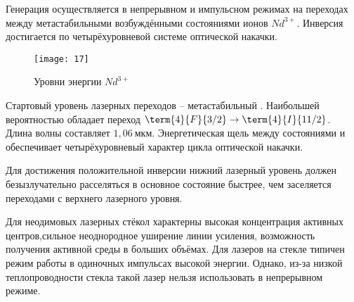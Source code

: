 Генерация осуществляется в непрерывном и импульсном режимах на переходах между 
метастабильными возбуждёнными состояниями ионов \( Nd^{3+} \). Инверсия 
достигается по четырёхуровневой системе оптической накачки.

\begin{figure}[h]
    \center
    \texttt{[image: 17]}
    \caption{Уровни энергии \( Nd^{3+} \)}
\end{figure}

Стартовый уровень лазерных переходов -- метастабильный .
Наибольшей вероятностью обладает переход \( \term{4}{F}{3/2} \rightarrow
\term{4}{I}{11/2} \). Длина волны составляет \( 1,06~\text{мкм} \).
Энергетическая щель между состояниями  и 
обеспечивает четырёхуровневый характер цикла оптической накачки.

Для достижения положительной инверсии нижний лазерный уровень должен
безызлучательно расселяться в основное состояние быстрее, чем заселяется
переходами с верхнего лазерного уровня.

Для неодимовых лазерных стёкол характерны высокая концентрация активных 
центров,сильное неоднородное уширение линии усиления, возможность получения 
активной среды в больших объёмах. Для лазеров на стекле типичен режим работы 
в одиночных импульсах высокой энергии. Однако, из-за низкой теплопроводности 
стекла такой лазер нельзя использовать в непрерывном режиме.